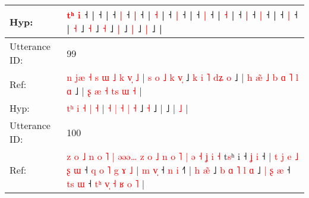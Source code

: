 \documentclass[10pt]{article}
\DeclareRobustCommand{\hl}[1]{{\textcolor{red}{#1}}}
\begin{document}
\begin{longtable}{ll}
 \\
Hyp: & \hl{}\hl{}\hl{}\hl{}\hl{}\hl{}\hl{}\hl{}\hl{}\hl{}\hl{t}\hl{ʰ} \hl{}\hl{i} ˧\hl{}\hl{}\hl{}\hl{}\hl{}\hl{}\hl{}\hl{}\hl{}\hl{}\hl{}\hl{}\hl{} |\hl{}\hl{}\hl{}\hl{}\hl{} ˧\hl{}\hl{}\hl{}\hl{}\hl{}\hl{}\hl{}\hl{}\hl{}\hl{}\hl{}\hl{}\hl{} |\hl{}\hl{} ˧\hl{}\hl{} \hl{}\hl{|} ˧\hl{}\hl{} \hl{|} ˧\hl{}\hl{}\hl{}\hl{}\hl{}\hl{} |\hl{}\hl{}\hl{}\hl{}\hl{}\hl{}\hl{}\hl{}\hl{}\hl{}\hl{} \hl{}\hl{˧} |\hl{}\hl{}\hl{}\hl{}\hl{}\hl{}\hl{}\hl{}\hl{} ˧\hl{}\hl{} \hl{|} ˧ |\hl{}\hl{}\hl{}\hl{} ˧ \hl{}\hl{|} ˧\hl{}\hl{}\hl{}\hl{}\hl{}\hl{} |\hl{}\hl{}\hl{}\hl{}\hl{}\hl{}\hl{}\hl{}\hl{}\hl{}\hl{}\hl{}\hl{}\hl{}\hl{}\hl{}\hl{}\hl{}\hl{}\hl{}\hl{}\hl{}\hl{}\hl{} \hl{˧} |\hl{}\hl{}\hl{}\hl{} ˧\hl{}\hl{} \hl{|} ˧\hl{}\hl{} \hl{|} ˧\hl{}\hl{}\hl{}\hl{}\hl{}\hl{}\hl{} |\hl{}\hl{}\hl{}\hl{}\hl{}\hl{} ˧\hl{}\hl{} \hl{|} ˧ |\hl{}\hl{} \hl{}\hl{˧} ˩\hl{}\hl{}\hl{}\hl{}\hl{}\hl{}\hl{}\hl{} \hl{˧} ˩\hl{}\hl{}\hl{}\hl{} \hl{˧} ˩\hl{}\hl{} \hl{|} ˩\hl{}\hl{} \hl{|} ˩\hl{}\hl{} \hl{|} ˩\hl{} |
 \\
\midrule
Utterance ID: & 99 \\
Ref: & \hl{n}\hl{ }\hl{j}\hl{æ}\hl{ }\hl{˧}\hl{ }\hl{s}\hl{ }\hl{ɯ} \hl{˩} \hl{k} \hl{v}\hl{̩} \hl{˩} | \hl{s} \hl{o} \hl{˩} \hl{k} \hl{v}\hl{̩} ˩\hl{ }\hl{k}\hl{ }\hl{i}\hl{ }\hl{˥}\hl{ }\hl{d}\hl{ʑ} \hl{o} ˩ |\hl{ }\hl{h}\hl{ }\hl{æ}\hl{̃}\hl{ }\hl{˩}\hl{ }\hl{b}\hl{ }\hl{ɑ}\hl{ }\hl{˥}\hl{ }\hl{l}\hl{ }\hl{ɑ} ˩ |\hl{ }\hl{ʂ}\hl{ }\hl{æ}\hl{ }\hl{˧}\hl{ }\hl{t}\hl{s}\hl{ }\hl{ɯ} \hl{˧} |
 \\
Hyp: & \hl{}\hl{}\hl{}\hl{}\hl{}\hl{}\hl{}\hl{}\hl{t}\hl{ʰ} \hl{i} \hl{˧} \hl{}\hl{|} \hl{˧} | \hl{˧} \hl{|} \hl{˧} \hl{|} \hl{}\hl{˧} ˩\hl{}\hl{}\hl{}\hl{}\hl{}\hl{}\hl{}\hl{}\hl{} \hl{˧} ˩ |\hl{}\hl{}\hl{}\hl{}\hl{}\hl{}\hl{}\hl{}\hl{}\hl{}\hl{}\hl{}\hl{}\hl{}\hl{}\hl{}\hl{} ˩ |\hl{}\hl{}\hl{}\hl{}\hl{}\hl{}\hl{}\hl{}\hl{}\hl{}\hl{} \hl{˩} |
 \\
\midrule
Utterance ID: & 100 \\
Ref: & \hl{z}\hl{ }\hl{o}\hl{ }\hl{˩}\hl{ }\hl{n}\hl{ }\hl{o}\hl{ }\hl{˥}\hl{ }\hl{|}\hl{ }\hl{ə}\hl{ə}\hl{ə}\hl{…}\hl{ }\hl{z}\hl{ }\hl{o}\hl{ }\hl{˩}\hl{ }\hl{n}\hl{ }\hl{o}\hl{ }\hl{˥}\hl{ }\hl{|}\hl{ }\hl{ə}\hl{ }\hl{˧}\hl{ }\hl{ʝ}\hl{ }\hl{i}\hl{ }\hl{˧}\hl{ }t\hl{s}ʰ i ˧\hl{ }\hl{ʝ} \hl{i} ˧ |\hl{ }\hl{t}\hl{ }\hl{j}\hl{ }\hl{e}\hl{ }\hl{˩}\hl{ }\hl{ʂ}\hl{ }\hl{ɯ} ˧\hl{ }\hl{q}\hl{ }\hl{o} \hl{˥} \hl{g} \hl{ɤ} \hl{˩} | \hl{m} \hl{v}\hl{̩} ˧\hl{ }\hl{n} \hl{i} ˧\hl{˥} |\hl{ }\hl{h} \hl{æ}\hl{̃} ˩\hl{ }\hl{b}\hl{ }\hl{ɑ}\hl{ }\hl{˥}\hl{ }\hl{l} \hl{ɑ} ˩\hl{ }\hl{|}\hl{ }\hl{ʂ}\hl{ }\hl{æ} ˧\hl{ }\hl{t}\hl{s} \hl{ɯ} ˧\hl{ }\hl{t}\hl{ʰ} \hl{v}\hl{̩} \hl{˧} \hl{ʁ} \hl{o} \hl{˥} |

\end{longtable}
\end{document}

